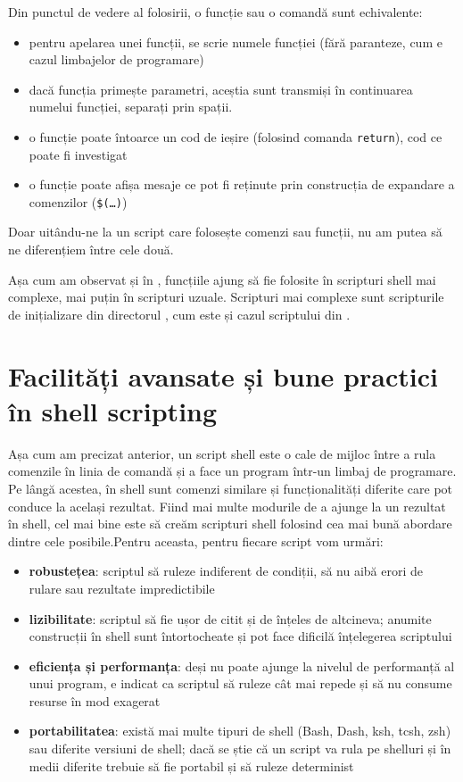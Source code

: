 Din punctul de vedere al folosirii, o funcție sau o comandă sunt echivalente:
\begin{itemize}
  \item pentru apelarea unei funcții, se scrie numele funcției (fără paranteze, cum e cazul limbajelor de programare)
  \item dacă funcția primește parametri, aceștia sunt transmiși în continuarea numelui funcției, separați prin spații.
  \item o funcție poate întoarce un cod de ieșire (folosind comanda \texttt{return}), cod ce poate fi investigat
  \item o funcție poate afișa mesaje ce pot fi reținute prin construcția de expandare a comenzilor (\texttt{\$(\ldots)})
\end{itemize}
Doar uitându-ne la un script care folosește comenzi sau funcții, nu am putea să ne diferențiem între cele două.

Așa cum am observat și în , funcțiile ajung să fie folosite în scripturi shell mai complexe, mai puțin în scripturi uzuale.
Scripturi mai complexe sunt scripturile de inițializare din directorul , cum este și cazul scriptului  din .

\section{Facilități avansate și bune practici în shell scripting}
\label{sec:auto:script-advanced}

Așa cum am precizat anterior, un script shell este o cale de mijloc între a rula comenzile în linia de comandă și a face un program într-un limbaj de programare.
Pe lângă acestea, în shell sunt comenzi similare și funcționalități diferite care pot conduce la același rezultat.
Fiind mai multe modurile de a ajunge la un rezultat în shell, cel mai bine este să creăm scripturi shell folosind cea mai bună abordare dintre cele posibile.Pentru aceasta, pentru fiecare script vom urmări:

\begin{itemize}
  \item \textbf{robustețea}: scriptul să ruleze indiferent de condiții, să nu aibă erori de rulare sau rezultate impredictibile
  \item \textbf{lizibilitate}: scriptul să fie ușor de citit și de înțeles de altcineva; anumite construcții în shell sunt întortocheate și pot face dificilă înțelegerea scriptului
  \item \textbf{eficiența și performanța}: deși nu poate ajunge la nivelul de performanță al unui program, e indicat ca scriptul să ruleze cât mai repede și să nu consume resurse în mod exagerat
  \item \textbf{portabilitatea}: există mai multe tipuri de shell (Bash, Dash, ksh, tcsh, zsh) sau diferite versiuni de shell; dacă se știe că un script va rula pe shelluri și în medii diferite trebuie să fie portabil și să ruleze determinist
\end{itemize}

